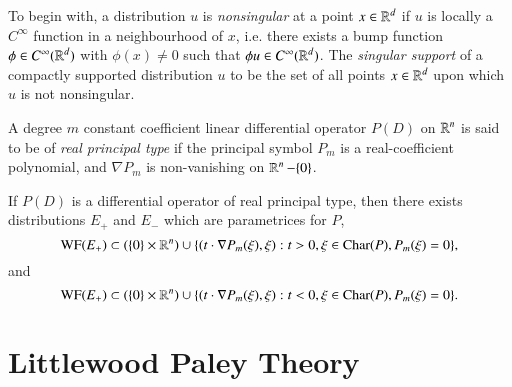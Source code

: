 To begin with, a distribution $u$ is \emph{nonsingular} at a point $x \in \operatorname{\mathbb{R}}^d$ if $u$ is locally a $C^\infty$ function in a neighbourhood of $x$, i.e. there exists a bump function $\phi \in C^\infty(\operatorname{\mathbb{R}}^d)$ with $\phi(x) \neq 0$ such that $\phi u \in C^\infty(\operatorname{\mathbb{R}}^d)$. The  \emph{singular support} of a compactly supported distribution $u$ to be the set of all points $x \in \operatorname{\mathbb{R}}^d$ upon which $u$ is not nonsingular.

\newpage

A degree $m$ constant coefficient linear differential operator $P(D)$ on $\operatorname{\mathbb{R}}^n$ is said to be of \emph{real principal type} if the principal symbol $P_m$ is a real-coefficient polynomial, and $\nabla P_m$ is non-vanishing on $\operatorname{\mathbb{R}}^n - \{ 0 \}$.

\begin{lemma}
    If $P(D)$ is a differential operator of real principal type, then there exists distributions $E_+$ and $E_-$ which are parametrices for $P$,
    \[ \text{WF}(E_+) \subset (\{ 0 \} \times \operatorname{\mathbb{R}}^n) \cup \{ (t \cdot \nabla P_m(\xi), \xi) : t > 0, \xi \in \text{Char}(P), P_m(\xi) = 0 \}, \]
    and
    \[ \text{WF}(E_+) \subset (\{ 0 \} \times \operatorname{\mathbb{R}}^n) \cup \{ (t \cdot \nabla P_m(\xi), \xi) : t < 0, \xi \in \text{Char}(P), P_m(\xi) = 0 \}. \]
\end{lemma}



















\section{Littlewood Paley Theory}





